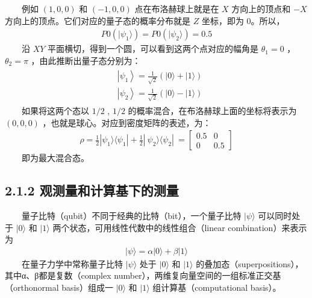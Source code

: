 \documentclass[a4paper,11pt,english]{sphinxmanual}
\begin{document}
\sphinxAtStartPar
  例如 \((1,0,0)\) 和 \((-1,0,0)\) 点在布洛赫球上就是在 \(X\) 方向上的顶点和 \(-X\) 方向上的顶点。它们对应的量子态的概率分布就是 \(Z\) 坐标，即为 \(0\) ​。所以，
\begin{equation*}
\begin{split}P 0(|\psi _{1}\rangle)=P 0(|\psi _{2}\rangle)=0.5\end{split}
\end{equation*}
\sphinxAtStartPar
  沿 \(XY\) 平面横切，得到一个圆，可以看到这两个点对应的幅角是 \(\theta_1 =0\) ， \(\theta_2 = \pi\) ，由此推断出量子态分别为：
\begin{equation*}
\begin{split}\begin{aligned} &\left|\psi_{1}\right\rangle=\frac{1}{\sqrt{2}}(|0\rangle+|1\rangle) \\ &\left|\psi_{2}\right\rangle=\frac{1}{\sqrt{2}}(|0\rangle-|1\rangle) \end{aligned}\end{split}
\end{equation*}
\sphinxAtStartPar
  如果将这两个态以 \(1/2\) ,  \(1/2\) 的概率混合，在布洛赫球上面的坐标将表示为 \((0,0,0)\) ，也就是球心。对应到密度矩阵的表述，为：
\begin{equation*}
\begin{split}\rho=\frac{1}{2}|\psi_{1}\rangle\langle\psi_{1} |+\frac{1}{2}|\ \psi_{2}\rangle\langle\psi_{2}| \ =\left[\begin{array}{cc} 0.5 & 0 \\ 0 & 0.5 \end{array}\right]\end{split}
\end{equation*}
\sphinxAtStartPar
  即为最大混合态。


\subsection{2.1.2 观测量和计算基下的测量}
\label{\detokenize{rst/2.1_u91cf_u5b50_u529b_u5b66_u7406_u8bba_u57fa_u7840:id3}}
\sphinxAtStartPar
  量子比特（qubit）不同于经典的比特（bit），一个量子比特 \(|\psi\rangle\) 可以同时处于 \(|0 \rangle\) 和 \(|1 \rangle\) 两个状态，可用线性代数中的线性组合（linear combination）来表示为
\begin{equation*}
\begin{split}|\psi\rangle=\alpha|0\rangle+\beta|1\rangle\end{split}
\end{equation*}
\sphinxAtStartPar
  在量子力学中常称量子比特 \(|\psi\rangle\) 处于 \(|0\rangle\) 和 \(|1\rangle\) 的叠加态（superpositions），其中α、β都是复数（complex number），两维复向量空间的一组标准正交基（orthonormal basis）组成一 \(|0 \rangle\) 和 \(|1 \rangle\) 组计算基（computational basis）。
\end{document}
